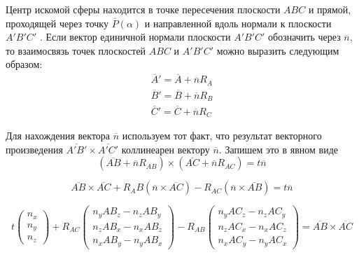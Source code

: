 Центр искомой сферы находится в точке пересечения плоскости $ABC$ и прямой, проходящей через точку $\overline{P}(\alpha)$ и направленной вдоль нормали к плоскости $A'B'C'$ .
Если вектор единичной нормали плоскости $A'B'C'$ обозначить через $\overline{n}$, то взаимосвязь точек плоскостей $ABC$ и $A'B'C'$ можно выразить следующим образом:
\begin{equation}
	\begin{aligned}
		\overline{A}' = \overline{A} + \overline{n}R_A \\
		\overline{B}' = \overline{B} + \overline{n}R_B \\
		\overline{C}' = \overline{C} + \overline{n}R_C
	\end{aligned}
\end{equation}

Для нахождения вектора $\overline{n}$ используем тот факт, что результат векторного произведения $\overline{A'B'} \times \overline{A'C'}$ коллинеарен вектору $\overline{n}$.
Запишем это в явном виде
\begin{equation}
	(\overline{AB} + \overline{n} R_{AB}) \times (\overline{AC} + \overline{n} R_{AC}) = t \overline{n}
\end{equation}

\begin{equation}
	\overline{AB} \times \overline{AC} + R_AB(\overline{n} \times \overline{AC}) - R_{AC}(\overline{n} \times \overline{AB}) = t \overline{n}
\end{equation}

\begin{equation}\label{eqn:text_1_remesh_common_envelope_matr}
	t
	\begin{pmatrix}
		n_x \\
		n_y \\
		n_z
	\end{pmatrix}
	+ R_{AC}
	\begin{pmatrix}
		n_y AB_z - n_z AB_y \\
		n_z AB_x - n_x AB_z \\
		n_x AB_y - n_y AB_x
	\end{pmatrix}
	- R_{AB}
	\begin{pmatrix}
		n_y AC_z - n_z AC_y \\
		n_z AC_x - n_x AC_z \\
		n_x AC_y - n_y AC_x
	\end{pmatrix}
	= \overline{AB} \times \overline{AC}
\end{equation}

